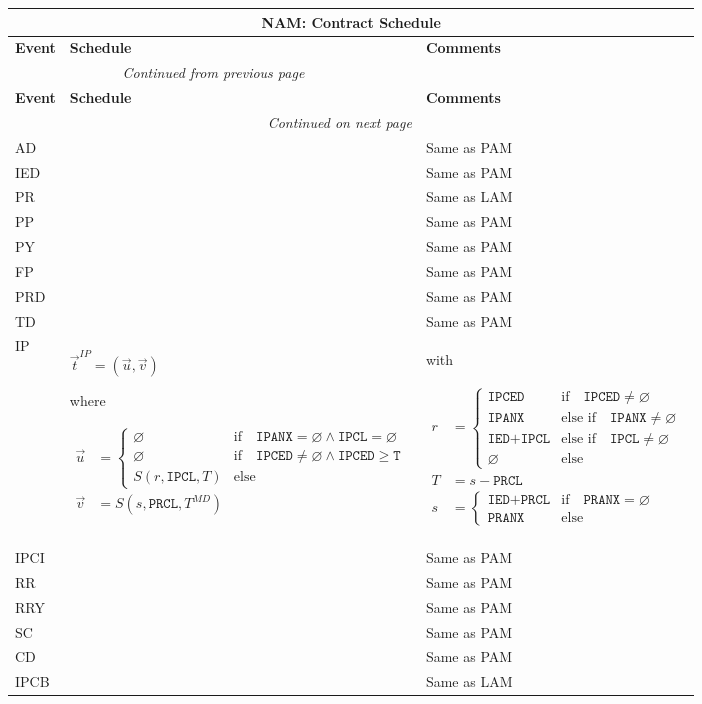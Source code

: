 \documentclass[9pt,oneside]{amsart}
\newenvironment{schedule}[1]{
	\begin{longtable}[H]{| p{0.05\textwidth} | p{0.5\textwidth} |  p{0.4\textwidth} |}
	\multicolumn{3}{c}{\textbf{#1: Contract Schedule}}\\
	\hline
	\textbf{Event} & \textbf{Schedule} & \textbf{Comments} \\
	\hline
	\endfirsthead
	\multicolumn{2}{c}{\textit{Continued from previous page}} \\
	\hline
	\textbf{Event} & \textbf{Schedule} & \textbf{Comments} \\
	\hline
	\endhead
	\hline \multicolumn{2}{r}{\textit{Continued on next page}} \\
	\endfoot
	\hline
	\endlastfoot
}{%
	\end{longtable}
}
\newcommand{\attr}[1]{\texttt{#1}}
\newcommand{\sdl}[3]{S(#1,#2,#3)}
\newcommand{\undef}{\varnothing}
\begin{document}
\begin{schedule}{NAM}
	AD & & Same as PAM \\
	\hline
	IED & & Same as PAM \\
	\hline
	PR & & Same as LAM \\
	\hline
	PP & & Same as PAM \\
	\hline
	PY & & Same as PAM \\
	\hline
	FP & & Same as PAM \\
	\hline
	PRD & & Same as PAM \\
	\hline
	TD & & Same as PAM \\
	\hline
	IP & $\vec{t}^{IP} = (\vec{u},\vec{v})$ \par
		where \par
		{$\begin{aligned} \vec{u} &= \begin{cases} \undef & \text{if}\quad \attr{IPANX}=\undef\land\attr{IPCL}=\undef \\
							\undef & \text{if}\quad \attr{IPCED}\neq\undef\land\attr{IPCED}\geq\attr{T}\\
							\sdl{r}{\attr{IPCL}}{T} & \text{else} \end{cases} \\
				\vec{v} &= \sdl{s}{\attr{PRCL}}{T^{MD}} \end{aligned}$}
		 & with\par {$\begin{aligned} r &= \begin{cases} \attr{IPCED} & \text{if}\quad \attr{IPCED}\neq\undef \\
								\attr{IPANX} & \text{else if}\quad \attr{IPANX}\neq\undef \\
								\attr{IED}+\attr{IPCL} & \text{else if}\quad \attr{IPCL}\neq\undef \\
								\undef & \text{else} \end{cases} \\
						T &= s-\attr{PRCL} \\
						s &= \begin{cases} \attr{IED}+\attr{PRCL} & \text{if} \quad \attr{PRANX} = \undef \\
					   \attr{PRANX} & \text{else} \end{cases} \end{aligned}$} \\
	\hline
	IPCI & & Same as PAM \\
	\hline
	RR & & Same as PAM \\
	\hline
	RRY & & Same as PAM \\
  	\hline
	SC & & Same as PAM \\
	\hline
	CD & & Same as PAM \\
  	\hline
	IPCB & & Same as LAM \\
	\hline
\end{schedule}
\end{document}
